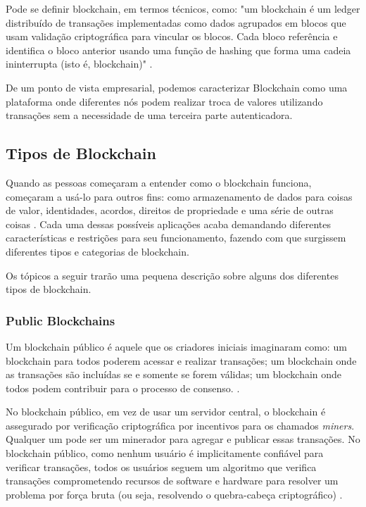     Pode se definir blockchain, em termos técnicos, como: "um blockchain é um ledger distribuído de transações implementadas como dados agrupados em blocos que usam validação criptográfica para vincular os blocos. Cada bloco referência e identifica o bloco anterior usando uma função de hashing que forma uma cadeia ininterrupta (isto é, blockchain)" \cite{blockchain_pratical_guide}.
    
    De um ponto de vista empresarial, podemos caracterizar Blockchain como uma plataforma onde diferentes nós podem realizar troca de valores utilizando transações sem a necessidade de uma terceira parte autenticadora.
    
    
    
    \subsection{Tipos de Blockchain}

    Quando as pessoas começaram a entender como o blockchain funciona, começaram a usá-lo para outros fins: como armazenamento de dados para coisas de valor, identidades, acordos, direitos de propriedade e uma série de outras coisas \cite{blockchain_pratical_guide}. Cada uma dessas possíveis aplicações acaba demandando diferentes características e restrições para seu funcionamento, fazendo com que surgissem diferentes tipos e categorias de blockchain.
    
    Os tópicos a seguir trarão uma pequena descrição sobre alguns dos diferentes tipos de blockchain.
    
    
    \subsubsection{Public Blockchains}
    
    Um blockchain público é aquele que os criadores iniciais imaginaram como: um blockchain para todos poderem acessar e realizar transações; um blockchain onde as transações são incluídas se e somente se forem válidas; um blockchain onde todos podem contribuir para o processo de consenso. \cite{blockchain_pratical_guide}.
    
    No blockchain público, em vez de usar um servidor central, o blockchain é assegurado por verificação criptográfica por incentivos para os chamados \textit{miners}. Qualquer um pode ser um minerador para agregar e publicar essas transações. No blockchain público, como nenhum usuário é implicitamente confiável para verificar transações, todos os usuários seguem um algoritmo que verifica transações comprometendo recursos de software e hardware para resolver um problema por força bruta (ou seja, resolvendo o quebra-cabeça criptográfico) \cite{blockchain_pratical_guide}.
    

